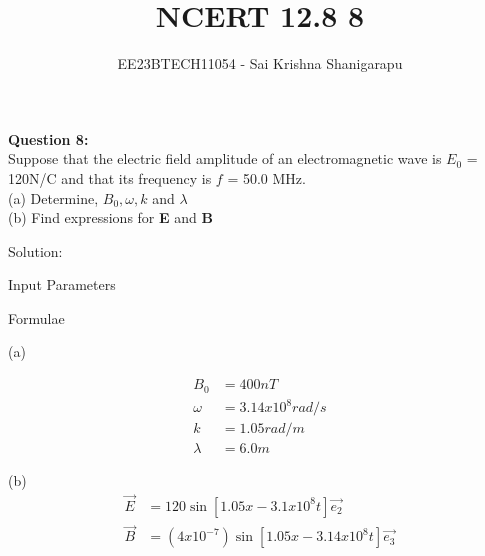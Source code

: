 \documentclass[journal,12pt,twocolumn]{IEEEtran}
\theoremstyle{remark}
\begin{document}

\vspace{3cm}

\title{NCERT 12.8 8}
\author{EE23BTECH11054 - Sai Krishna Shanigarapu%
}
\maketitle
\newpage
\bigskip

\begin{flushleft}
\textbf{Question 8:}\\
Suppose that the electric field amplitude of an electromagnetic wave is $E_0$ = 120N/C and that its frequency is $f$ = 50.0 MHz.\\
(a) Determine, $B_0, \omega, k$ and $\lambda$\\
(b) Find expressions for \textbf{E} and \textbf{B}\\
\end{flushleft}

\bigskip

\begin{flushleft}
Solution:
\end{flushleft}

\begin{center}
    \begin{table}[ht]
        \caption{Input Parameters}
        
        \label{tab:table1.12.8.8}
    \end{table}
\end{center}

\begin{flushleft}
    \begin{table}[ht]
       \caption{Formulae}
       
       \label{tab:table2.12.8.8}
    \end{table}
\bigskip
\end{flushleft}

\begin{flushleft}
    (a)
\end{flushleft}

\begin{align}
    B_0  &= 400nT\\
    \omega &= 3.14 x 10^8 rad/s\\
    k &= 1.05 rad/m\\
    \lambda &=  6.0m 
\end{align}

\begin{flushleft}
    (b)\\ 
    \begin{align}
    \vec{E} &= 120 \sin[1.05x - 3.1 x 10^8t]\vec{e_2}\\
    \vec{B} &= (4 x 10^{-7})\sin[1.05x - 3.14 x 10^8t]\vec{e_3}
    \end{align} 
\end{flushleft}
\end{document}
